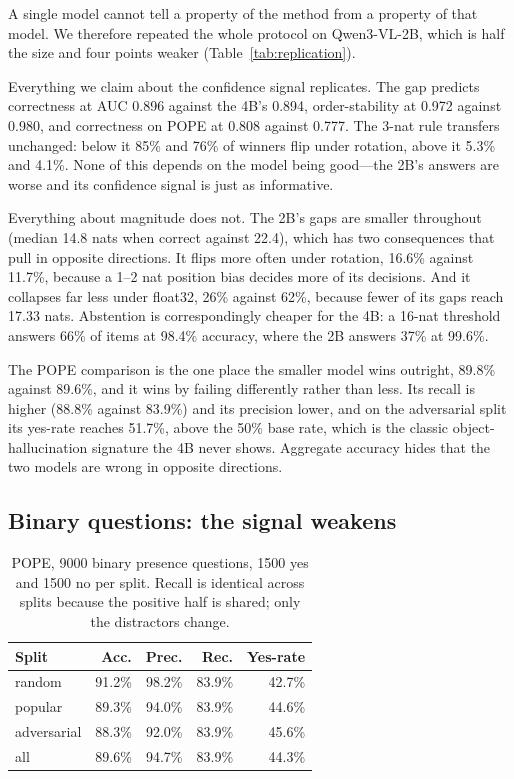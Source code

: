\documentclass[10pt,twocolumn]{article}
\begin{document}
A single model cannot tell a property of the method from a property of that
model. We therefore repeated the whole protocol on Qwen3-VL-2B, which is half
the size and four points weaker (Table~\ref{tab:replication}).

Everything we claim about the confidence signal replicates. The gap predicts
correctness at AUC 0.896 against the 4B's 0.894, order-stability at 0.972
against 0.980, and correctness on POPE at 0.808 against 0.777. The 3-nat rule
transfers unchanged: below it 85\% and 76\% of winners flip under rotation,
above it 5.3\% and 4.1\%. None of this depends on the model being good---the
2B's answers are worse and its confidence signal is just as informative.

Everything about magnitude does not. The 2B's gaps are smaller throughout
(median 14.8 nats when correct against 22.4), which has two consequences that
pull in opposite directions. It flips more often under rotation, 16.6\% against
11.7\%, because a 1--2 nat position bias decides more of its decisions. And it
collapses far less under float32, 26\% against 62\%, because fewer of its gaps
reach 17.33 nats. Abstention is correspondingly cheaper for the 4B: a 16-nat
threshold answers 66\% of items at 98.4\% accuracy, where the 2B answers 37\%
at 99.6\%.

The POPE comparison is the one place the smaller model wins outright, 89.8\%
against 89.6\%, and it wins by failing differently rather than less. Its recall
is higher (88.8\% against 83.9\%) and its precision lower, and on the
adversarial split its yes-rate reaches 51.7\%, above the 50\% base rate, which
is the classic object-hallucination signature the 4B never shows. Aggregate
accuracy hides that the two models are wrong in opposite directions.

\subsection{Binary questions: the signal weakens}
\label{sec:pope}

\begin{table}[t]
\centering\small
\caption{POPE, 9000 binary presence questions, 1500 yes and 1500 no per split.
Recall is identical across splits because the positive half is shared; only the
distractors change.}
\label{tab:pope}
\begin{tabular}{lrrrr}
\toprule
Split & Acc. & Prec. & Rec. & Yes-rate \\
\midrule
random      & 91.2\% & 98.2\% & 83.9\% & 42.7\% \\
popular     & 89.3\% & 94.0\% & 83.9\% & 44.6\% \\
adversarial & 88.3\% & 92.0\% & 83.9\% & 45.6\% \\
\midrule
all         & 89.6\% & 94.7\% & 83.9\% & 44.3\% \\
\bottomrule
\end{tabular}
\end{table}
\end{document}
